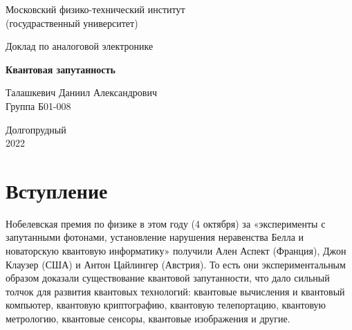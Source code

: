 \documentclass[a4paper, 12pt]{article}%
\begin{document}


\begin{titlepage}

	\newpage
	\begin{center}
		\normalsize Московский физико-технический институт \\(госудраственный 			университет)
	\end{center}

	\vspace{6em}

	\begin{center}
		\Large Доклад по аналоговой электронике\\
	\end{center}

	\vspace{1em}

	\begin{center}
		\large \textbf{Квантовая запутанность}
	\end{center}

	\vspace{2em}

	\begin{center}
		\large Талашкевич Даниил Александрович\\
		Группа Б01-008
	\end{center}

	\vspace{\fill}

	\begin{center}
	Долгопрудный \\2022
	\end{center}
	
\end{titlepage}



	\thispagestyle{empty}
	\newpage
	\tableofcontents
	\newpage
	\setcounter{page}{1}



\section{Вступление}

Нобелевская премия по физике в этом году (4 октября) за «эксперименты с запутанными фотонами, установление нарушения неравенства Белла и новаторскую квантовую информатику» получили Ален Аспект (Франция), Джон Клаузер (США) и Антон Цайлингер (Австрия). То есть они экспериментальным образом доказали существование квантовой запутанности, что дало сильный толчок для развития квантовых технологий: квантовые вычисления и квантовый компьютер, квантовую криптографию, квантовую телепортацию, квантовую метрологию, квантовые сенсоры, квантовые изображения и другие.
\end{document}
